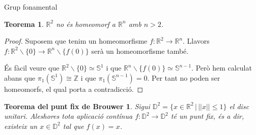 \documentclass{beamer}
\newtheorem{teorema}{Teorema}
\newtheorem{teoremaBrouwer}{Teorema del punt fix de Brouwer}
\theoremstyle{definition}
\begin{document}
\begin{frame}{Grup fonamental}
\begin{teorema}
$\mathbb{R}^2$ no \'{e}s homeomorf a $\mathbb{R}^n$ amb $n>2$.
\end{teorema}
\pause
\begin{proof}
Suposem que tenim un homeomorfisme $f:\mathbb{R}^2\rightarrow\mathbb{R}^n$. Llavors $f:\mathbb{R}^2\backslash\{0\}\rightarrow\mathbb{R}^n\backslash\{f(0)\}$ ser\`{a} un homeomorfisme tamb\'{e}.
\pause

\'{E}s f\`{a}cil veure que $\mathbb{R}^2\backslash\{0\}\simeq\mathbb{S}^1$ i que $\mathbb{R}^n\backslash\{f(0)\}\simeq\mathbb{S}^{n-1}$. Per\`{o} hem calculat abans que $\pi_1(\mathbb{S}^1)\cong\mathbb{Z}$ i que $\pi_1(\mathbb{S}^{n-1})=0$. Per tant no poden ser homeomorfs, el qual porta a contradicci\'{o}.
\end{proof}
\pause

\begin{teoremaBrouwer}
Sigui $\mathbb{D}^2=\{x\in\mathbb{R}^2\,|\,||x||\leq1\}$ el disc unitari. Aleshores tota aplicaci\'{o} cont\'{i}nua $f:\mathbb{D}^2\rightarrow\mathbb{D}^2$ t\'{e} un punt fix, \'{e}s a dir, existeix un $x\in\mathbb{D}^2$ tal que $f(x)=x$.
\end{teoremaBrouwer}
\end{frame}
\end{document}
